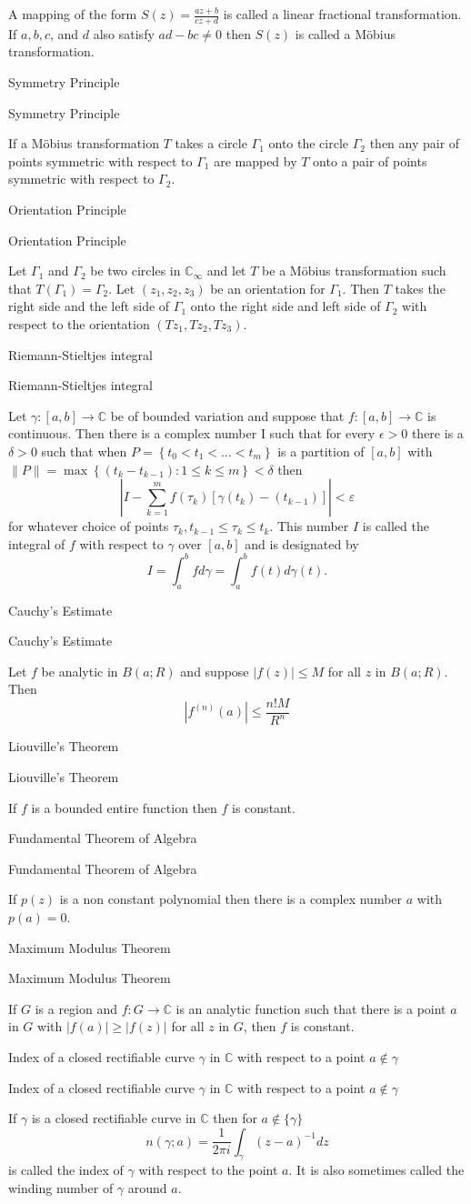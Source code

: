 \documentclass[17pt]{extarticle}
\newcommand{\C}{\mathbb{C}}
\newcommand{\abs}[1]{\left\vert#1\right\vert}
\newcommand{\LP}{\left(}
\newcommand{\RP}{\right)}
\newcommand{\LB}{\left[}
\newcommand{\RB}{\right]}
\newcommand{\boxset}[2]{\begin{mdframed}[style=darkQuesion]
#1
\end{mdframed}
\newpage
\begin{mdframed}[style=darkQuesion]
  #1
    \end{mdframed}
\begin{mdframed}[style=darkAnswer]
  #2
    \end{mdframed}
    \newpage
}
\begin{document}
{ A mapping of the form $S(z)=\frac{a z+b}{c z+d}$ is called a linear fractional transformation. If $a, b, c$, and $d$ also satisfy $a d-b c \neq 0$ then $S(z)$ is called a Möbius transformation.}
\boxset{Symmetry Principle }
{ If a Möbius transformation $T$ takes a circle $\Gamma_{1}$ onto the circle $\Gamma_{2}$ then any pair of points symmetric with respect to $\Gamma_{1}$ are mapped by $T$ onto a pair of points symmetric with respect to $\Gamma_{2}$.}
\boxset{Orientation Principle }
{ Let $\Gamma_{1}$ and $\Gamma_{2}$ be two circles in $\C_{\infty}$ and let $T$ be a Möbius transformation such that $T\left(\Gamma_{1}\right)=\Gamma_{2}$. Let $\left(z_{1}, z_{2}, z_{3}\right)$ be an orientation for $\Gamma_{1}$. Then $T$ takes the right side and the left side of $\Gamma_{1}$ onto the right side and left side of $\Gamma_{2}$ with respect to the orientation $\left(T z_{1}, T z_{2}, T z_{3}\right)$.}
\boxset{Riemann-Stieltjes integral }
{ Let $\gamma:[a, b] \rightarrow \C$ be of bounded variation and suppose that $f:[a, b] \rightarrow \C$ is continuous. Then there is a complex number I such that for every $\epsilon>0$ there is a $\delta>0$ such that when $P=\left\{t_{0}<t_{1}<\ldots<t_{m}\right\}$ is a partition of $[a, b]$ with $\|P\|=\max \left\{\left(t_{k}-t_{k-1}\right): 1 \leq k \leq m\right\}<\delta$ then \[\abs{I-\sum_{k=1}^m f\LP\tau_k\RP\LB\gamma\LP t_k\RP-\LP t_{k-1}\RP\RB}<\varepsilon\] for whatever choice of points $\tau_{k}, t_{k-1} \leq \tau_{k} \leq t_{k}$. This number $I$ is called the integral of $f$ with respect to $\gamma$ over $[a, b]$ and is designated by \[I=\int_{a}^{b} f d \gamma=\int_{a}^{b} f(t) d \gamma(t) .\] }
\boxset{Cauchy's Estimate }
{ Let $f$ be analytic in $B(a ; R)$ and suppose $|f(z)| \leq M$ for all $z$ in $B(a ; R)$. Then \[\left|f^{(n)}(a)\right| \leq \frac{n ! M}{R^{n}}\] }
\boxset{Liouville's Theorem }
{ If $f$ is a bounded entire function then $f$ is constant.}
\boxset{Fundamental Theorem of Algebra }
{ If $p(z)$ is a non constant polynomial then there is a complex number $a$ with $p(a)=0$.}
\boxset{Maximum Modulus Theorem }
{ If $G$ is a region and $f: G \rightarrow \C$ is an analytic function such that there is a point $a$ in $G$ with $|f(a)| \geq|f(z)|$ for all $z$ in $G$, then $f$ is constant.}
\boxset{Index of a closed rectifiable curve $\gamma$ in $\C$ with respect to a point $a \notin \gamma$ }
{ If $\gamma$ is a closed rectifiable curve in $\C$ then for $a \notin\{\gamma\}$ \[n(\gamma ; a)=\frac{1}{2 \pi i} \int_{\gamma}(z-a)^{-1} d z\]  is called the index of $\gamma$ with respect to the point $a$. It is also sometimes called the winding number of $\gamma$ around $a$.}
\end{document}
